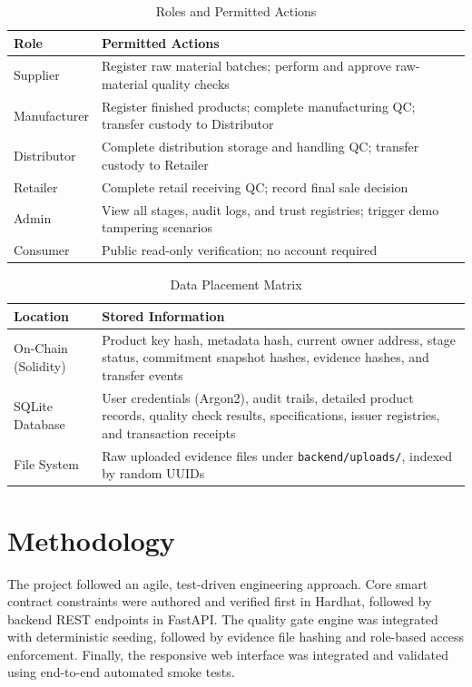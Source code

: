 \documentclass[12pt,a4paper]{report}
\begin{document}
\begin{table}[H]
\centering
\caption{Roles and Permitted Actions}
\label{tab:roles}
\small
\renewcommand{\arraystretch}{1.22}
\begin{tabularx}{\textwidth}{L{3.2cm} Y}
\toprule
\textbf{Role} & \textbf{Permitted Actions} \\
\midrule
Supplier & Register raw material batches; perform and approve raw-material quality checks \\
Manufacturer & Register finished products; complete manufacturing QC; transfer custody to Distributor \\
Distributor & Complete distribution storage and handling QC; transfer custody to Retailer \\
Retailer & Complete retail receiving QC; record final sale decision \\
Admin & View all stages, audit logs, and trust registries; trigger demo tampering scenarios \\
Consumer & Public read-only verification; no account required \\
\bottomrule
\end{tabularx}
\end{table}

\begin{table}[H]
\centering
\caption{Data Placement Matrix}
\label{tab:dataplc}
\small
\renewcommand{\arraystretch}{1.22}
\begin{tabularx}{\textwidth}{L{4.0cm} Y}
\toprule
\textbf{Location} & \textbf{Stored Information} \\
\midrule
On-Chain (Solidity) & Product key hash, metadata hash, current owner address, stage status, commitment snapshot hashes, evidence hashes, and transfer events \\
SQLite Database & User credentials (Argon2), audit trails, detailed product records, quality check results, specifications, issuer registries, and transaction receipts \\
File System & Raw uploaded evidence files under \texttt{backend/uploads/}, indexed by random UUIDs \\
\bottomrule
\end{tabularx}
\end{table}

\section{Methodology}
The project followed an agile, test-driven engineering approach. Core smart contract constraints were authored and verified first in Hardhat, followed by backend REST endpoints in FastAPI. The quality gate engine was integrated with deterministic seeding, followed by evidence file hashing and role-based access enforcement. Finally, the responsive web interface was integrated and validated using end-to-end automated smoke tests.
\end{document}
